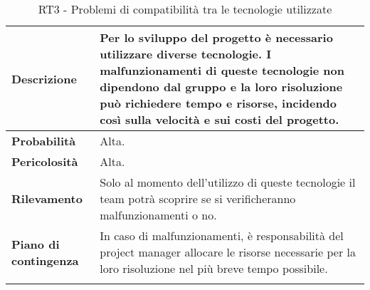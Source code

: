 \begin{longtable}{ | l | p{10cm} | }
	\hline
	\textbf{Descrizione}          & Per lo sviluppo del progetto è necessario utilizzare diverse tecnologie. I malfunzionamenti di queste tecnologie non dipendono dal gruppo e la loro risoluzione può richiedere tempo e risorse, incidendo così sulla velocità e sui costi del progetto. \\
	\hline
	\textbf{Probabilità}          & Alta.                                                                                                                                                                                                                                                   \\
	\hline
	\textbf{Pericolosità}         & Alta.                                                                                                                                                                                                                                                   \\
	\hline
	\textbf{Rilevamento}          & Solo al momento dell'utilizzo di queste tecnologie il team potrà scoprire se si verificheranno malfunzionamenti o no.                                                                                                                                   \\
	\hline
	\textbf{Piano di contingenza} & In caso di malfunzionamenti, è responsabilità del project manager allocare le risorse necessarie per la loro risoluzione nel più breve tempo possibile.                                                                                                 \\
	\hline
	\caption{RT3 - Problemi di compatibilità tra le tecnologie utilizzate}
	\label{table:7}
\end{longtable}


\newpage


